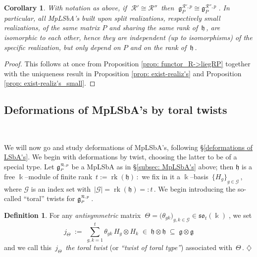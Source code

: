 \documentclass[12pt,reqno,twoside,a4paper]{amsart}
\numberwithin{equation}{section}
\newtheorem{cor}[lema]{Corollary}
\theoremstyle{definition}
\newtheorem{definition}[lema]{Definition}
\newtheorem{free text}[lema]{}
\theoremstyle{remark}
\newcommand \rk{\operatorname{rk}}
\newcommand{\R}{{\mathcal R}}
\newcommand{\G}{{\mathcal G}}
\def \k {\Bbbk}
\def \G {\mathcal{G}}
\def \Ppicc {{\scriptscriptstyle P}}
\def \Thetapicc {{\scriptscriptstyle \Theta}}
\def \lieg{\mathfrak{g}}
\def \liegRpP{\mathfrak{g}^{\raise1pt\hbox{$ \scriptscriptstyle \mathcal{R},p $}}_\Ppicc}
\def \lieh{\mathfrak{h}}
\def \lieso{\mathfrak{so}}
\def \pf{\begin{proof}}
\def \epf{\end{proof}}
\theoremstyle{plain}
\begin{document}
\vskip9pt

\begin{cor}  \label{cor: isom_R -> isom_liegRP}
%
 With notation as above, if  $ \; \R' \cong \R'' \, $  then
 $ \; \lieg^{\scriptscriptstyle \R',p}_\Ppicc \cong \lieg^{\scriptscriptstyle \R'',p}_\Ppicc \; $.
%
 \vskip3pt
%
   In particular, all MpLSbA's built upon split realizations,
   respectively small realizations, of the same matrix  $ P $
   and sharing the same rank of  $ \, \lieh \, $,  are isomorphic to each other,
   hence they are independent (up to isomorphisms) of the specific realization,
   but only depend on  $ P $  and on the rank of  $ \, \lieh \, $.
%
\end{cor}

\pf
%
 This follows at once from  Proposition \ref{prop: functor_R->liegRP}
 together with the uniqueness result in  Proposition \ref{prop: exist-realiz's}
 and  Proposition \ref{prop: exist-realiz's_small}.
%
\epf

\medskip


\subsection{Deformations of MpLSbA's by toral twists}  \label{subsec: tor-twist def's_mp-Lie_supbialg's}  {\ }

\vskip7pt

   We will now go and study deformations of MpLSbA's, following
   \S \ref{deformations of LSbA's}.
   We begin with deformations by twist, choosing the latter to be of a special type.
%
 \vskip5pt
%
 Let  $ \liegRpP $  be a MpLSbA as in  \S \ref{subsec: MpLSbA's}  above;
 then  $ \lieh $  is a free  $ \k $--module  of finite rank  $ \, t := \rk(\lieh) \, $:
 \,we fix in it a  $ \k $--basis  $ \, {\big\{ H_g \big\}}_{g \in \G} \, $,  where
 $ \G $  is an index set with  $ \, |\G| = \rk(\lieh) =: t \, $.
 We begin introducing the so-called ``toral'' twists for  $ \liegRpP \, $.

\vskip9pt

\begin{definition}  \label{def: toral twists x MpLbA's}
%
 For any  \textsl{antisymmetric\/}  matrix
 $ \; \Theta = \big( \theta_{gk} \big)_{g, k \in \G} \in \lieso_t(\Bbbk) \; $,  \;we set
%
\begin{equation}  \label{eq: def_twist_Lie-bialg_2nd-time}
  j_\Thetapicc  \; := \;  {\textstyle \sum_{g,k=1}^t} \theta_{gk} \, H_g \otimes H_k  \; \in \;
  \lieh \otimes \lieh  \; \subseteq \;  \lieg \otimes \lieg
%
\end{equation}
%
 and we call this  $ \, j_\Thetapicc \, $  \textit{the toral twist\/}
 (or  \textit{``twist of toral type''\/})
 associated with  $ \, \Theta\, $.   \hfill  $ \diamondsuit $
%
\end{definition}
\end{document}
